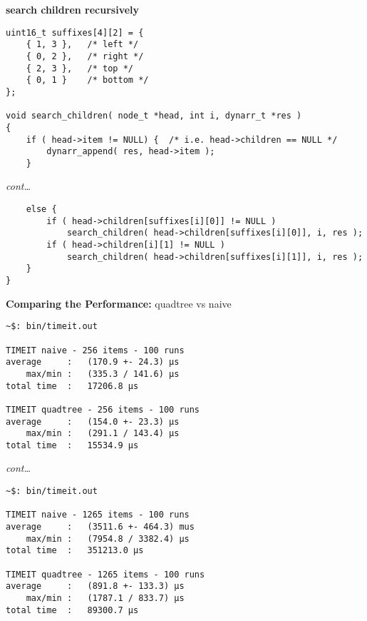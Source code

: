 \begin{frame}[fragile]
    \textbf{search children recursively}
    \begin{verbatim}
uint16_t suffixes[4][2] = {
    { 1, 3 },   /* left */
    { 0, 2 },   /* right */
    { 2, 3 },   /* top */
    { 0, 1 }    /* bottom */
};

void search_children( node_t *head, int i, dynarr_t *res )
{
    if ( head->item != NULL) {  /* i.e. head->children == NULL */
        dynarr_append( res, head->item );
    }
    \end{verbatim}
\end{frame}

\begin{frame}[fragile]
    \textit{cont\dots}
    \begin{verbatim}
    else {
        if ( head->children[suffixes[i][0]] != NULL )
            search_children( head->children[suffixes[i][0]], i, res );
        if ( head->children[i][1] != NULL )
            search_children( head->children[suffixes[i][1]], i, res );
    }
}
\end{verbatim}
\end{frame}

\begin{frame}[fragile]
    \textbf{Comparing the Performance:} quadtree vs naive
    \begin{verbatim}
~$: bin/timeit.out

TIMEIT naive - 256 items - 100 runs
average     :   (170.9 +- 24.3) μs
    max/min :   (335.3 / 141.6) μs
total time  :   17206.8 μs

TIMEIT quadtree - 256 items - 100 runs
average     :   (154.0 +- 23.3) μs
    max/min :   (291.1 / 143.4) μs
total time  :   15534.9 μs

    \end{verbatim}
\end{frame}

\begin{frame}[fragile]
    \textit{cont\dots}
    \begin{verbatim}
~$: bin/timeit.out

TIMEIT naive - 1265 items - 100 runs
average     :   (3511.6 +- 464.3) mus
    max/min :   (7954.8 / 3382.4) μs
total time  :   351213.0 μs

TIMEIT quadtree - 1265 items - 100 runs
average     :   (891.8 +- 133.3) μs
    max/min :   (1787.1 / 833.7) μs
total time  :   89300.7 μs

    \end{verbatim}
\end{frame}

